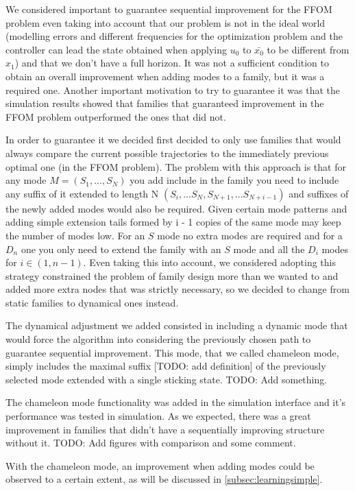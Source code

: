\documentclass[12,twoside]{TFG-GM}
\theoremstyle{definition}
\theoremstyle{remark}
\newcommand*\diff[1]{\bar{#1}}
\begin{document}
We considered important to guarantee sequential improvement for the FFOM problem even taking into account that our problem is not in the ideal world (modelling errors and different frequencies for the optimization problem and the controller can lead the state obtained when applying $u_0$ to $\diff{x_0}$ to be different from $x_1$) and that we don't have a full horizon. It was not a sufficient condition to obtain an overall improvement when adding modes to a family, but it was a required one. Another important motivation to try to guarantee it was that the simulation results showed that families that guaranteed improvement in the FFOM problem outperformed the ones that did not.

In order to guarantee it we decided first decided to only use families that would always compare the current possible trajectories to the immediately previous optimal one (in the FFOM problem). The problem with this approach is that for any mode $M = (S_1, ..., S_N)$ you add include in the family you need to include any suffix of it extended to length N $(S_i, ... S_N, S_{N+1}, ... S_{N+i-1})$ and suffixes of the newly added modes would also be required. Given certain mode patterns and adding simple extension tails formed by i - 1 copies of the same mode may keep the number of modes low. For an $S$ mode no extra modes are required and for a $D_n$ one you only need to extend the family with an $S$ mode and all the $D_i$ modes for $i \in (1, n-1)$. Even taking this into account, we considered adopting this strategy constrained the problem of family design more than we wanted to and added more extra nodes that was strictly necessary, so we decided to change from static families to dynamical ones instead.

The dynamical adjustment we added consisted in including a dynamic mode that would force the algorithm into considering the previously chosen path to guarantee sequential improvement. This mode, that we called chameleon mode, simply includes the maximal suffix [TODO: add definition] of the previously selected mode extended with a single sticking state. TODO: Add something.

The chameleon mode functionality was added in the simulation interface and it's performance was tested in simulation. As we expected, there was a great improvement in families that didn't have a sequentially improving structure without it. TODO: Add figures with comparison and some comment.

With the chameleon mode, an improvement when adding modes could be observed to a certain extent, as will be discussed in \ref{subsec:learningsimple}.
\end{document}
